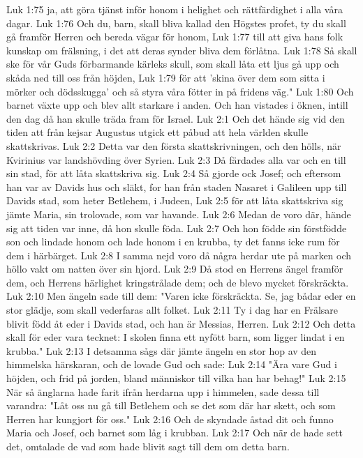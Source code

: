 Luk 1:75  ja, att göra tjänst inför honom i helighet och rättfärdighet i alla våra dagar.
Luk 1:76  Och du, barn, skall bliva kallad den Högstes profet, ty du skall gå framför Herren och bereda vägar för honom,
Luk 1:77  till att giva hans folk kunskap om frälsning, i det att deras synder bliva dem förlåtna.
Luk 1:78  Så skall ske för vår Guds förbarmande kärleks skull, som skall låta ett ljus gå upp och skåda ned till oss från höjden,
Luk 1:79  för att 'skina över dem som sitta i mörker och dödsskugga' och så styra våra fötter in på fridens väg."
Luk 1:80  Och barnet växte upp och blev allt starkare i anden. Och han vistades i öknen, intill den dag då han skulle träda fram för Israel.
Luk 2:1  Och det hände sig vid den tiden att från kejsar Augustus utgick ett påbud att hela världen skulle skattskrivas.
Luk 2:2  Detta var den första skattskrivningen, och den hölls, när Kvirinius var landshövding över Syrien.
Luk 2:3  Då färdades alla var och en till sin stad, för att låta skattskriva sig.
Luk 2:4  Så gjorde ock Josef; och eftersom han var av Davids hus och släkt, for han från staden Nasaret i Galileen upp till Davids stad, som heter Betlehem, i Judeen,
Luk 2:5  för att låta skattskriva sig jämte Maria, sin trolovade, som var havande.
Luk 2:6  Medan de voro där, hände sig att tiden var inne, då hon skulle föda.
Luk 2:7  Och hon födde sin förstfödde son och lindade honom och lade honom i en krubba, ty det fanns icke rum för dem i härbärget.
Luk 2:8  I samma nejd voro då några herdar ute på marken och höllo vakt om natten över sin hjord.
Luk 2:9  Då stod en Herrens ängel framför dem, och Herrens härlighet kringstrålade dem; och de blevo mycket förskräckta.
Luk 2:10  Men ängeln sade till dem: "Varen icke förskräckta. Se, jag bådar eder en stor glädje, som skall vederfaras allt folket.
Luk 2:11  Ty i dag har en Frälsare blivit född åt eder i Davids stad, och han är Messias, Herren.
Luk 2:12  Och detta skall för eder vara tecknet: I skolen finna ett nyfött barn, som ligger lindat i en krubba."
Luk 2:13  I detsamma sågs där jämte ängeln en stor hop av den himmelska härskaran, och de lovade Gud och sade:
Luk 2:14  "Ära vare Gud i höjden, och frid på jorden, bland människor till vilka han har behag!"
Luk 2:15  När så änglarna hade farit ifrån herdarna upp i himmelen, sade dessa till varandra: "Låt oss nu gå till Betlehem och se det som där har skett, och som Herren har kungjort för oss."
Luk 2:16  Och de skyndade åstad dit och funno Maria och Josef, och barnet som låg i krubban.
Luk 2:17  Och när de hade sett det, omtalade de vad som hade blivit sagt till dem om detta barn.
